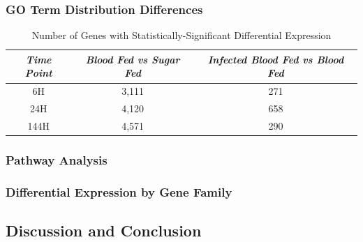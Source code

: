 \subsubsection{GO Term Distribution Differences}

\begin{table}[H]
  \centering
  \begin{tabular}{c c c} \hline
  \emph{Time Point} & \emph{Blood Fed vs Sugar Fed} & \emph{Infected Blood Fed vs Blood Fed} \\ \hline
  6H & 3,111 & 271 \\ \hline
  24H & 4,120 & 658 \\ \hline
  144H & 4,571 & 290 \\ \hline
  \end{tabular}
  \caption{Number of Genes with Statistically-Significant Differential Expression}
  \label{tab:stat-sig-genes}
\end{table}

\subsubsection{Pathway Analysis}

\subsubsection{Differential Expression by Gene Family}


\subsection{Discussion and Conclusion}